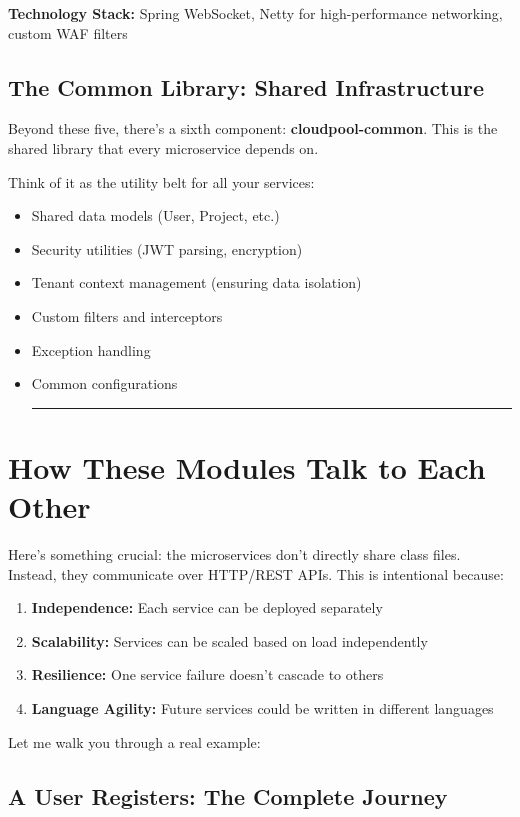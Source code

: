 \documentclass[11pt,a4paper]{report}
\begin{document}
\textbf{Technology Stack:} Spring WebSocket, Netty for high-performance networking, custom WAF filters


\section{The Common Library: Shared Infrastructure}


Beyond these five, there's a sixth component: \textbf{cloudpool-common}. This is the shared library that every microservice depends on.

Think of it as the utility belt for all your services:

\begin{itemize}
\item Shared data models (User, Project, etc.)
\item Security utilities (JWT parsing, encryption)
\item Tenant context management (ensuring data isolation)
\item Custom filters and interceptors
\item Exception handling
\item Common configurations


\vfill\hrule\vfill


\end{itemize}

\chapter{How These Modules Talk to Each Other}


Here's something crucial: the microservices don't directly share class files. Instead, they communicate over HTTP/REST APIs. This is intentional because:

\begin{enumerate}
\item \textbf{Independence:} Each service can be deployed separately
\item \textbf{Scalability:} Services can be scaled based on load independently
\item \textbf{Resilience:} One service failure doesn't cascade to others
\item \textbf{Language Agility:} Future services could be written in different languages

\end{enumerate}
Let me walk you through a real example:


\section{A User Registers: The Complete Journey}
\end{document}
